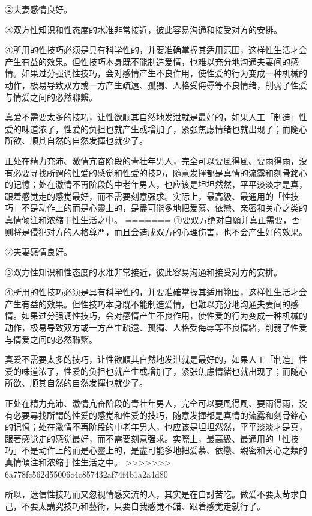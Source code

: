 \documentclass[12pt,UTF8]{ctexbook}
\begin{document}
②夫妻感情良好。

③双方性知识和性态度的水准非常接近，彼此容易沟通和接受对方的安排。

④所用的性技巧必须是具有科学性的，并要准确掌握其适用范围，这样性生活才会产生有益的效果。但性技巧本身既不能制造爱情，也难以充分地沟通夫妻间的感情。如果过分强调性技巧，会对感情产生不良作用，使性爱的行为变成一种机械的动作，极易导致双方或一方产生疏遠、孤獨、人格受侮辱等不良情绪，削弱了性爱与情爱之间的必然聯繫。

真爱不需要太多的技巧，让性欲顺其自然地发泄就是最好的，如果人工「制造」性爱的味道浓了，性爱的负担也就产生或增加了，紧张焦虑情绪也就出现了；而隨心所欲、顺其自然的自然发揮也就少了。

正处在精力充沛、激情亢奋阶段的青壮年男人，完全可以要風得風、要雨得雨，没有必要寻找所谓的性爱的感觉和性爱的技巧，隨意发揮都是真情的流露和刻骨銘心的记憶；处在激情不再阶段的中老年男人，也应该是坦坦然然，平平淡淡才是真，跟着感觉走的感觉最好，而不需要刻意强求。实际上，最高級、最通用的「性技巧」不是动作上的而是心靈上的，是盡可能多地把爱慕、依戀、亲密和关心之类的真情倾注和浓缩于性生活之中。
=======
①要双方绝对自願并真正需要，否则将是侵犯对方的人格尊严，而且会造成双方的心理伤害，也不会产生好的效果。

②夫妻感情良好。

③双方性知识和性态度的水准非常接近，彼此容易沟通和接受对方的安排。

④所用的性技巧必须是具有科学性的，并要准確掌握其适用範围，这样性生活才会产生有益的效果。但性技巧本身既不能制造爱情，也難以充分地沟通夫妻间的感情。如果过分强调性技巧，会对感情产生不良作用，使性爱的行为变成一种机械的动作，极易导致双方或一方产生疏遠、孤獨、人格受侮辱等不良情緒，削弱了性爱与情爱之间的必然聯繫。

真爱不需要太多的技巧，让性欲順其自然地发泄就是最好的，如果人工「制造」性爱的味道浓了，性爱的负担也就产生或增加了，紧张焦慮情緒也就出现了；而随心所欲、順其自然的自然发揮也就少了。

正处在精力充沛、激情亢奋阶段的青壮年男人，完全可以要風得風、要雨得雨，没有必要尋找所謂的性爱的感觉和性爱的技巧，随意发揮都是真情的流露和刻骨銘心的记憶；处在激情不再阶段的中老年男人，也应该是坦坦然然，平平淡淡才是真，跟著感觉走的感觉最好，而不需要刻意强求。实際上，最高級、最通用的「性技巧」不是动作上的而是心靈上的，是盡可能多地把爱慕、依戀、親密和关心之類的真情傾注和浓缩于性生活之中。
>>>>>>> 6a778fc562d55006c4c857432af74f4b1a2a4d80

所以，迷信性技巧而又忽视情感交流的人，其实是在自討苦吃。做爱不要太苛求自己，不要太講究技巧和藝術，只要自我感觉不錯、跟着感觉走就行了。
\end{document}

